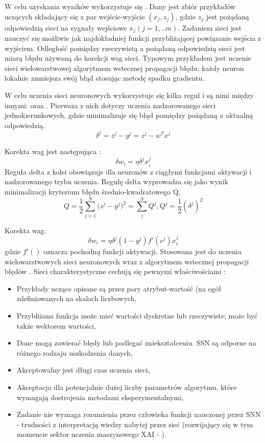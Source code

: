 W celu uzyskania wyników wykorzystuje się . Dany jest zbiór przykładów uczących składający się z par wejście-wyjście $(x_{j}, z_{j})$, gdzie $z_{j}$ jest pożądaną odpowiedzią sieci na sygnały wejściowe $x_{j} (j=1,..m)$. Zadaniem sieci jest nauczyć się możliwie jak najdokładniej funkcji przybliżającej powiązanie wejścia z wyjściem. Odległość pomiędzy rzeczywistą a pożądaną odpowiedzią sieci jest
miarą błędu używaną do korekcji wag sieci. Typowym przykładem jest uczenie sieci wielowarstwowej algorytmem wstecznej propagacji błędu; każdy neuron lokalnie zmniejsza swój błąd stosując metodę spadku gradientu.

W celu uczenia sieci neuronowych wykorzystuje się kilka reguł i są nimi między innymi:  oraz . Pierwsza z nich dotyczy uczenia nadzorowanego sieci jednokierunkowych, gdzie minimalizuje się błąd pomiędzy pożądaną a aktualną odpowiedzią. 
\[
\delta^{j} = z^{j} - y^{j} = z^{j} - w^{T}x^{j}
\]

Korekta wag jest następująca \cite{Widrow}:
\begin{equation}
\label{eqn:delta}
\delta w_{i} = \eta \delta^{j} x^{j}_{i}
\end{equation}
Reguła delta z kolei obowiązuje dla neuronów z ciągłymi funkcjami aktywacji i nadzorowanego trybu uczenia. Regułę delta wyprowadza się jako wynik minimalizacji kryterium błędu średnio-kwadratowego Q.
\[
Q = \frac{1}{2}\sum_{j=1}^{N} \big( z^{j} - y^{j}\big)^{2} = \sum_{j}^{N}Q^{j}, Q^{j} = \frac{1}{2}(\delta^{j})^{2}
\]

Korekta wag:
\[
\delta w_{i} = \eta \delta^{j} (1 - y^{j}) f'(e^{j}) x^{j}_{i}
\]
gdzie $f'()$ oznacza pochodną funkcji aktywacji. Stosowana jest do uczenia wielowarstwowych sieci neuronowych wraz z algorytmem wstecznej propagacji błędów \cite{Rumelhart}. Sieci charakterystyczne cechują się pewnymi właściwościami \cite{Mitchell}:
\begin{itemize}
    \item Przykłady uczące opisane są przez pary atrybut-wartość (na ogół
zdefiniowanych na skalach liczbowych,
    \item Przybliżana funkcja może mieć wartości dyskretne lub rzeczywiste;
może być także wektorem wartości,
 \item Dane mogą zawierać błędy lub podlegać zniekształceniu. SSN są
odporne na różnego rodzaju uszkodzenia danych, 
    \item Akceptowalny jest długi czas uczenia sieci,
    \item Akceptacja dla potencjalnie dużej liczby parametrów algorytmu,
które wymagają dostrojenia metodami eksperymentalnymi,
    \item Zadanie nie wymaga rozumienia przez człowieka funkcji
nauczonej przez SNN - trudności z interpretacją wiedzy nabytej
przez sieć (rozwijający się w tym momencie sektor uczenia maszynowego XAI - ).
\end{itemize}

